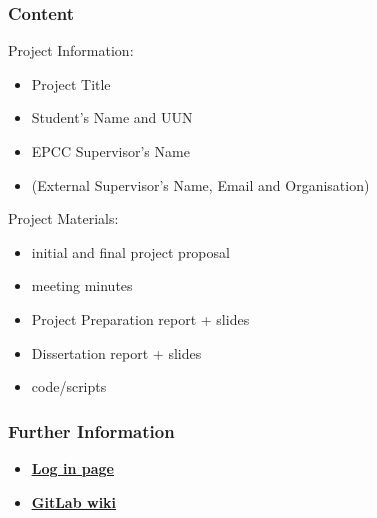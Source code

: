 \documentclass[xcolor=x11names,compress,usenames,dvipsnames,mathsans]{beamer}
\newcommand{\link}[1]{\textbf{\textcolor{PMS3025}{\underline{#1}}}}
\begin{document}
\begin{frame}
\frametitle{Content}


Project Information:
	\begin{itemize}
		\item Project Title
		\item Student's Name and UUN
		\item EPCC Supervisor's Name
		\item (External Supervisor's Name, Email and Organisation)
	\end{itemize}

\vfill
\pause

Project Materials:
	\begin{itemize}
		\item initial and final project proposal
		\item meeting minutes
		\item Project Preparation report + slides
		\item Dissertation report + slides
		\item code/scripts
	\end{itemize}

\end{frame}


\begin{frame}
\frametitle{Further Information}

\begin{itemize}
	\item \href{https://git.ecdf.ed.ac.uk/}{\link{Log in page}}
	\item \href{https://www.wiki.ed.ac.uk/pages/viewpage.action?spaceKey=ResearchServices\&title=Version+Control+Service+-+GitLab}{\link{GitLab wiki}}
\end{itemize}

\end{frame}

\end{document}

